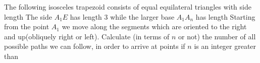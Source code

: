 The following isosceles trapezoid consists of equal equilateral triangles with side length   The side $A_1E$ has length $3$ while the larger base $A_1A_n$ has length   Starting from the point $A_1$ we move along the segments which are oriented to the right and up(obliquely right or left). Calculate (in terms of $n$ or not) the number of all possible paths we can follow, in order to arrive at points  if $n$ is an integer greater than 

